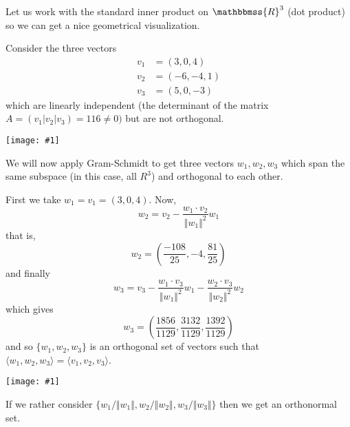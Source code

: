 \documentclass[12pt]{article}
\newcommand{\R}{\mathbbmss{R}}
\newcommand{\figura}[1]{\begin{center}\texttt{[image: \#1]}\end{center}}
\begin{document}
Let us work with the standard inner product on $\R^3$ (dot product) so we can get  a nice geometrical visualization.

Consider the three vectors
\begin{align*}
v_1&=(3,0,4)\\
v_2&=(-6,-4,1)\\
v_3&=(5,0,-3)
\end{align*}
which are linearly independent (the determinant of the matrix $A=(v_1|v_2|v_3)=116\neq 0)$ but are not orthogonal.
\figura{vectores1.eps}
We will now apply Gram-Schmidt to get three vectors $w_1,w_2,w_3$ which span the same subspace (in this case, all $R^3$) and orthogonal to each other.

First we take $w_1=v_1=(3,0,4)$. Now,
\[w_2= v_2 - \frac{w_1\cdot v_2}{\Vert w_1\Vert^2}w_1\]
that is,
\[
w_2 = (\frac{-108}{25},-4,\frac{81}{25})
\]
and finally
\[
w_3=v_3-\frac{w_1\cdot v_3}{\Vert w_1\Vert^2}w_1 - \frac{w_2\cdot v_3}{\Vert w_2\Vert^2}w_2
\]
which gives
\[
w_3=(\frac{1856}{1129},\frac{3132}{1129},\frac{1392}{1129})
\]
and so $\{w_1,w_2,w_3\}$ is an orthogonal set of vectors such that $\langle w_1,w_2,w_3\rangle=\langle v_1,v_2,v_3\rangle$. 
\figura{vectores2}


If we rather consider $\{w_1/\Vert w_1\Vert,w_2/\Vert w_2\Vert,w_3/\Vert w_3\Vert\}$ then we get an orthonormal set.
\end{document}
